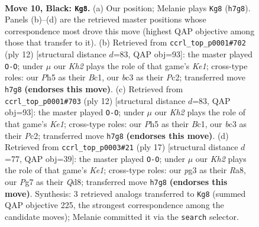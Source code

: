 \documentclass[11pt]{article}
\begin{document}
\clearpage

\begin{figure}[p]\centering
\begin{subfigure}{0.46\textwidth}\centering
\resizebox{\linewidth}{!}{%
\newchessgame
\chessboard[
  setfen={r1b2r2/ppppqppk/2n1pn2/7p/Q1PP4/2B2NP1/PP2PP1P/R3KB1R b - - 5 10},
  showmover=false,
  pgfstyle=straightmove, color=movearrow, markmove={h7-g8}
]}
\caption{}
\end{subfigure}\hfill
\begin{subfigure}{0.46\textwidth}\centering
\resizebox{\linewidth}{!}{%
\newchessgame
\chessboard[
  setfen={rn2kb1r/pp2pppp/2p2n2/q4b2/8/2N2NP1/PPPP1PBP/R1BQK2R w KQkq - 2 7},
  showmover=false,
  pgfstyle=straightmove, color=movearrow, markmove={e1-g1}
]}
\caption{}
\end{subfigure}
\\[4pt]
\begin{subfigure}{0.46\textwidth}\centering
\resizebox{\linewidth}{!}{%
\newchessgame
\chessboard[
  setfen={rn2kb1r/pp2pppp/2p2n2/q4b2/8/2N2NP1/PPPP1PBP/R1BQK2R w KQkq - 2 7},
  showmover=false,
  pgfstyle=straightmove, color=movearrow, markmove={e1-g1}
]}
\caption{}
\end{subfigure}\hfill
\begin{subfigure}{0.46\textwidth}\centering
\resizebox{\linewidth}{!}{%
\newchessgame
\chessboard[
  setfen={r1bqk2r/1pp3pp/2np1n2/p3pp2/2P5/PPQ2NP1/1B1PPP1P/R3KB1R b KQkq - 2 9},
  showmover=false,
  pgfstyle=straightmove, color=movearrow, markmove={e8-g8}
]}
\caption{}
\end{subfigure}
\caption{\textbf{Move 10, Black: \texttt{Kg8}.} (a) Our position; Melanie plays \texttt{Kg8} (\texttt{h7g8}). Panels (b)--(d) are the retrieved master positions whose correspondence most drove this move (highest QAP objective among those that transfer to it). (b) Retrieved from \texttt{ccrl\_top\_p0001\#702} (ply 12) [structural distance $d$=83, QAP obj=93]: the master played \texttt{O-O}; under $\mu$ our \emph{Kh2} plays the role of that game's \emph{Ke1}; cross-type roles: our \emph{P}h5 as their \emph{B}c1, our \emph{b}c3 as their \emph{P}c2; transferred move \texttt{h7g8} \textbf{(endorses this move)}. (c) Retrieved from \texttt{ccrl\_top\_p0001\#703} (ply 12) [structural distance $d$=83, QAP obj=93]: the master played \texttt{O-O}; under $\mu$ our \emph{Kh2} plays the role of that game's \emph{Ke1}; cross-type roles: our \emph{P}h5 as their \emph{B}c1, our \emph{b}c3 as their \emph{P}c2; transferred move \texttt{h7g8} \textbf{(endorses this move)}. (d) Retrieved from \texttt{ccrl\_top\_p0003\#21} (ply 17) [structural distance $d$=77, QAP obj=39]: the master played \texttt{O-O}; under $\mu$ our \emph{Kh2} plays the role of that game's \emph{Ke1}; cross-type roles: our \emph{p}g3 as their \emph{R}a8, our \emph{P}g7 as their \emph{Q}d8; transferred move \texttt{h7g8} \textbf{(endorses this move)}. Synthesis: 3 retrieved analogs transferred to \texttt{Kg8} (summed QAP objective 225, the strongest correspondence among the candidate moves); Melanie committed it via the \texttt{search} selector.}
\label{fig:thought-m19}
\end{figure}
\end{document}

